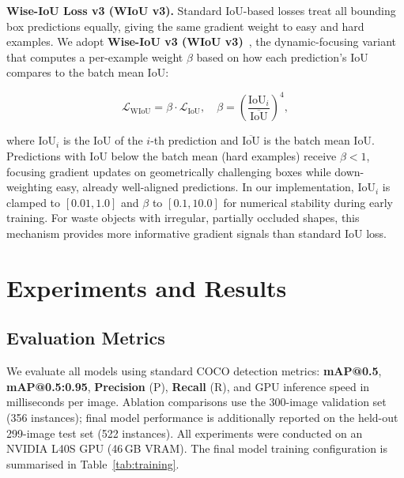 \documentclass[runningheads]{llncs}
\begin{document}
\textbf{Wise-IoU Loss v3 (WIoU v3).}
Standard IoU-based losses treat all bounding box predictions
equally, giving the same gradient weight to easy and hard examples.
We adopt \textbf{Wise-IoU v3 (WIoU v3)}~\cite{wiou2023}, the
dynamic-focusing variant that computes a per-example weight $\beta$
based on how each prediction's IoU compares to the batch mean IoU:

\begin{equation}
  \mathcal{L}_{\text{WIoU}} = \beta \cdot \mathcal{L}_{\text{IoU}}, \quad
  \beta = \left(\frac{\text{IoU}_i}{\overline{\text{IoU}}}\right)^{\!4},
  \label{eq:wiou}
\end{equation}

\noindent where $\text{IoU}_i$ is the IoU of the $i$-th prediction
and $\overline{\text{IoU}}$ is the batch mean IoU. Predictions with
IoU below the batch mean (hard examples) receive $\beta < 1$,
focusing gradient updates on geometrically challenging boxes while
down-weighting easy, already well-aligned predictions. In our
implementation, $\text{IoU}_i$ is clamped to $[0.01, 1.0]$ and
$\beta$ to $[0.1, 10.0]$ for numerical stability during early
training. For waste objects with irregular, partially occluded
shapes, this mechanism provides more informative gradient signals
than standard IoU loss.

\section{Experiments and Results}
\label{sec:experiments}


\subsection{Evaluation Metrics}

We evaluate all models using standard COCO detection metrics:
\textbf{mAP@0.5}, \textbf{mAP@0.5:0.95}, \textbf{Precision} (P),
\textbf{Recall} (R), and GPU inference speed in milliseconds per image.
Ablation comparisons use the 300-image validation set (356 instances);
final model performance is additionally reported on the held-out 299-image
test set (522 instances). All experiments were conducted on an NVIDIA L40S GPU (46\,GB VRAM).
The final model training configuration is summarised in
Table~\ref{tab:training}.
\end{document}
